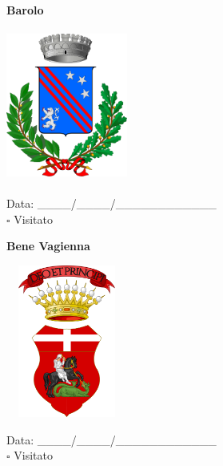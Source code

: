 \documentclass[a5paper,12pt]{article}
\begin{document}
\newpage

\noindent
\begin{minipage}[t]{0.45\textwidth}
    \begin{center}
        \textbf{Barolo}
    \end{center}
    \vspace{-0.5cm} %
    \begin{center}
        \includegraphics[height= 5cm, width=4cm]{Piemonte/Stemma Barolo.png}
    \end{center}
    \vspace{-0.4cm} %
    \begin{flushleft}
        Data: \_\_\_\_/\_\_\_\_/\_\_\_\_\_\_\_\_\_\_\_\_ \\
        $\square$ Visitato
    \end{flushleft}
\end{minipage}
\hfill
\noindent
\begin{minipage}[t]{0.45\textwidth}
    \begin{center}
        \textbf{Bene Vagienna}
    \end{center}
    \vspace{-0.5cm} %
    \begin{center}
        \includegraphics[height= 5cm, width=4cm]{Piemonte/Stemma Bene Vagienna.png}
    \end{center}
    \vspace{-0.4cm} %
    \begin{flushleft}
        Data: \_\_\_\_/\_\_\_\_/\_\_\_\_\_\_\_\_\_\_\_\_ \\
        $\square$ Visitato
    \end{flushleft}
\end{minipage}
\end{document}
